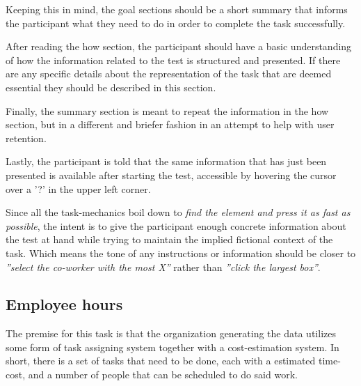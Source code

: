 {  Keeping this in mind, the goal sections should be a short summary that
  informs the participant what they need to do in order to complete the task
  successfully.

  After reading the how section, the participant should have a
  basic understanding of how the information related to the test is
  structured and presented. If there are any specific details about the
  representation of the task that are deemed essential they should be
  described in this section.

  Finally, the summary section is meant to repeat the information in the how
  section, but in a different and briefer fashion in an attempt to help with
  user retention.

  Lastly, the participant is told that the same information that has just
  been presented is available after starting the test, accessible by
  hovering the cursor over a '?' in the upper left corner.

  Since all the task-mechanics boil down to
  \textit{find the element and press it as fast as possible},
  the intent is to give the participant enough concrete
  information about the test at hand while trying to maintain the
  implied fictional context of the task. Which means the tone of any
  instructions or information should be closer to
  \textit{''select the co-worker with the most X''} rather than
  \textit{''click the largest box''}.


  \subsection{Employee hours}

    \textit{\ideaOne}

    The premise for this task is that the organization generating the data
    utilizes some form of task assigning system together with a
    cost-estimation system. In short, there is a set of tasks that need to
    be done, each with a estimated time-cost, and a number of people that
    can be scheduled to do said work.

}
